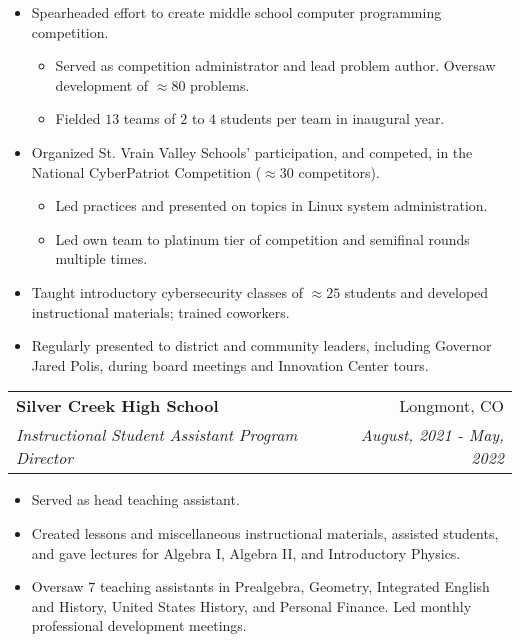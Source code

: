\documentclass[a4paper,20pt]{article}
\makeatletter
\newcommand{\resumeSubheading}[4]{
  \vspace{-1pt}\item
    \begin{tabular*}{0.97\textwidth}{l@{\extracolsep{\fill}}r}
      \textbf{#1} & #2 \\
      \textit{#3} & \textit{#4} \\
    \end{tabular*}\vspace{-5pt}
}
\makeatother
\begin{document}
    \begin{itemize}
        \itemsep -1pt {}
        \item Spearheaded effort to create middle school computer programming competition.
            \begin{itemize}
                \item Served as competition administrator and lead problem author. Oversaw development of \(\approx 80\) problems.
                \item Fielded \(13\) teams of \(2\) to \(4\) students per team in inaugural year.
            \end{itemize}
        \item Organized St. Vrain Valley Schools' participation, and competed, in the National CyberPatriot Competition (\(\approx 30\) competitors).
            \begin{itemize}
                \item Led practices and presented on topics in Linux system administration.
                \item Led own team to platinum tier of competition and semifinal rounds multiple times.
            \end{itemize}
        \item Taught introductory cybersecurity classes of \(\approx 25\) students and developed instructional materials; trained coworkers.
        \item Regularly presented to district and community leaders, including Governor Jared Polis, during board meetings and Innovation Center tours.
    \end{itemize}
\vspace{-5pt}
    \resumeSubheading
		{Silver Creek High School}{Longmont, CO}
		{Instructional Student Assistant Program Director}{August, 2021 -  May, 2022}
		\begin{itemize}
            \itemsep -1pt {}
            \item Served as head teaching assistant.
            \item Created lessons and miscellaneous instructional materials, assisted students, and gave lectures for Algebra I, Algebra II, and Introductory Physics.
            \item Oversaw \(7\) teaching assistants in Prealgebra, Geometry, Integrated English and History, United States History, and Personal Finance. Led monthly professional development meetings.
        \end{itemize}
\end{document}
